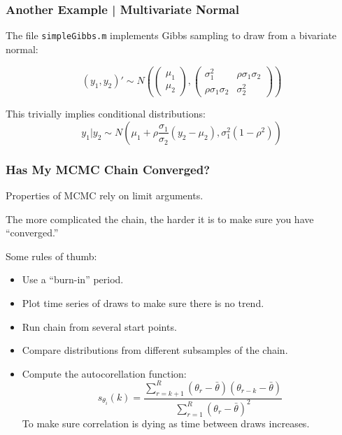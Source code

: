 \documentclass[11pt, aspectratio=169]{beamer}
\newcommand{\Skip}{\vspace{1em}}
\begin{document}
\begin{frame}[c]\frametitle{Another Example | Multivariate Normal}
    
The file {\tt simpleGibbs.m} implements Gibbs sampling to draw from a bivariate normal: 

$$(y_1, y_2)' \sim N\left( \begin{pmatrix} \mu_1 \\ \mu_2 \end{pmatrix}, \begin{pmatrix} \sigma_1^2 & \rho \sigma_1 \sigma_2 \\ \rho \sigma_1 \sigma_2 & \sigma_2^2 \end{pmatrix} \right) $$

This trivially implies conditional distributions: 
$$y_1 | y_2 \sim N(\mu_1 + \rho \frac{\sigma_1}{\sigma_2}(y_2 - \mu_2), \sigma_1^2(1 - \rho^2))$$



\end{frame}


\begin{frame}[c]\frametitle{Has My MCMC Chain Converged?}
    
Properties of MCMC rely on limit arguments.  

\Skip
The more complicated the chain, the harder it is to make sure you have ``converged.''    


\Skip
Some rules of thumb:
\begin{itemize}
  \item Use a ``burn-in'' period. 
  \item Plot time series of draws to make sure there is no trend. 
  \item Run chain from several start points. 
  \item Compare distributions from different subsamples of the chain. 
  \item Compute the autocorellation function: 
$$s_{\theta_i}(k) = \frac{ \sum_{r = k+1}^R (\theta_r - \bar{\theta})(\theta_{r-k} - \bar{\theta})}{ \sum_{r=1}^R  (\theta_r - \bar{\theta})^2} $$
To make sure correlation is dying as time between draws increases. 
\end{itemize}    


\end{frame}
\end{document}
